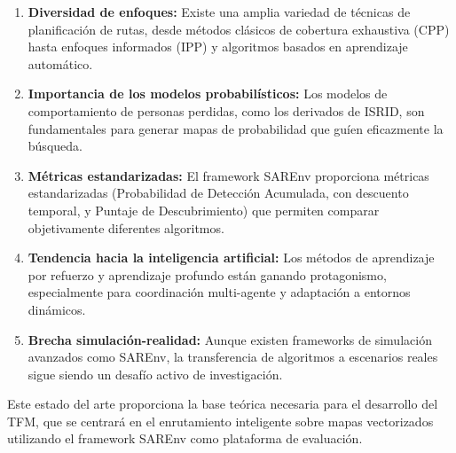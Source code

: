 \documentclass[12pt]{report} %
\begin{document}
\begin{enumerate}
	\item \textbf{Diversidad de enfoques:} Existe una amplia variedad de técnicas de planificación de rutas, desde métodos clásicos de cobertura exhaustiva (CPP) hasta enfoques informados (IPP) y algoritmos basados en aprendizaje automático.
	
	\item \textbf{Importancia de los modelos probabilísticos:} Los modelos de comportamiento de personas perdidas, como los derivados de ISRID, son fundamentales para generar mapas de probabilidad que guíen eficazmente la búsqueda.
	
	\item \textbf{Métricas estandarizadas:} El framework SAREnv proporciona métricas estandarizadas (Probabilidad de Detección Acumulada, con descuento temporal, y Puntaje de Descubrimiento) que permiten comparar objetivamente diferentes algoritmos.
	
	\item \textbf{Tendencia hacia la inteligencia artificial:} Los métodos de aprendizaje por refuerzo y aprendizaje profundo están ganando protagonismo, especialmente para coordinación multi-agente y adaptación a entornos dinámicos.
	
	\item \textbf{Brecha simulación-realidad:} Aunque existen frameworks de simulación avanzados como SAREnv, la transferencia de algoritmos a escenarios reales sigue siendo un desafío activo de investigación.
\end{enumerate}

Este estado del arte proporciona la base teórica necesaria para el desarrollo del TFM, que se centrará en el enrutamiento inteligente sobre mapas vectorizados utilizando el framework SAREnv como plataforma de evaluación.


\clearpage
{}
\printbibliography
\end{document}
